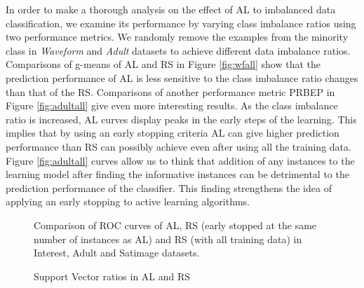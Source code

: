 In order to make a thorough analysis on the effect of AL to imbalanced data classification, we examine its performance by varying class imbalance ratios using two performance metrics. We randomly remove the examples from the minority class in \emph{Waveform} and \emph{Adult} datasets to achieve different data imbalance ratios. Comparisons of g-means of AL and RS in Figure \ref{fig:wfall} show that the prediction performance of AL is less sensitive to the class imbalance ratio changes than that of the RS. Comparisons of another performance metric PRBEP in Figure \ref{fig:adultall} give even more interesting results. As the class imbalance ratio is increased, AL curves display peaks in the early steps of the learning. This implies that by using an early stopping criteria AL can give higher prediction performance than RS can possibly achieve even after using all the training data. Figure \ref{fig:adultall} curves allow us to think that addition of any instances to the learning model after finding the informative instances can be detrimental to the prediction performance of the classifier. This finding strengthens the idea of applying an early stopping to active learning algorithms.

\begin{figure}[t!]
    \caption{Comparison of ROC curves of AL, RS (early stopped at the same number of instances as AL) and RS (with all training data) in Interest, Adult and Satimage datasets.}
    \label{fig:rocall}
\end{figure}
\begin{figure}[b!]
    \centering
    \caption{Support Vector ratios in AL and RS}
    \label{cruderatio}
\end{figure}


